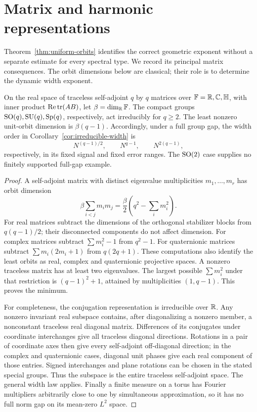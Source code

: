 \section{Matrix and harmonic representations}\label{sec:families}
Theorem~\ref{thm:uniform-orbits} identifies the correct geometric
exponent without a separate estimate for every spectral type. We
record its principal matrix consequences. The orbit dimensions below
are classical; their role is to determine the dynamic width exponent.

\begin{proposition}\label{prop:matrix-orbits}
On the real space of traceless self-adjoint $q$ by $q$ matrices over
$\mathbb F=\mathbb R,\mathbb C,\mathbb H$, with inner product $\operatorname{Re}\operatorname{tr}(AB)$, let
$\beta=\dim_\mathbb R\mathbb F$. The compact groups $\operatorname{SO}(q),\operatorname{SU}(q),\operatorname{Sp}(q)$,
respectively, act irreducibly for $q\ge2$. The least nonzero unit-orbit
dimension is $\beta(q-1)$. Accordingly, under a full group gap, the
width order in Corollary~\ref{cor:irreducible-width} is
\begin{equation}\label{eq:matrix-laws}
 N^{(q-1)/2},\qquad N^{q-1},\qquad N^{2(q-1)},
\end{equation}
respectively, in its fixed signal and fixed error ranges. The
$\operatorname{SO}(2)$ case supplies no finitely supported full-gap example.
\end{proposition}
\begin{proof}
A self-adjoint matrix with distinct eigenvalue multiplicities
$m_1,\ldots,m_r$ has orbit dimension
\[
 \beta\sum_{i<j}m_i m_j=\frac\beta2
                         \left(q^2-\sum_i m_i^2\right).
\]
For real matrices subtract the dimensions of the orthogonal
stabilizer blocks from $q(q-1)/2$; their disconnected components do
not affect dimension. For complex matrices subtract
$\sum m_i^2-1$ from $q^2-1$. For quaternionic matrices subtract
$\sum m_i(2m_i+1)$ from $q(2q+1)$. These computations also identify
the least orbits as real, complex and quaternionic projective spaces.
A nonzero traceless matrix has at least two eigenvalues. The largest
possible $\sum m_i^2$ under that restriction is $(q-1)^2+1$,
attained by multiplicities $(1,q-1)$. This proves the minimum.

For completeness, the conjugation representation is irreducible over
$\mathbb R$. Any nonzero invariant real subspace contains, after diagonalizing
a nonzero member, a nonconstant traceless real diagonal matrix.
Differences of its conjugates under coordinate interchanges give all
traceless diagonal directions. Rotations in a pair of coordinate
axes then give every self-adjoint off-diagonal direction; in the
complex and quaternionic cases, diagonal unit phases give each real
component of those entries. Signed interchanges and plane rotations
can be chosen in the stated special groups. Thus the subspace is the
entire traceless self-adjoint space. The general width law applies.
Finally a finite measure on a torus has Fourier multipliers arbitrarily
close to one by simultaneous approximation, so it has no full norm gap
on its mean-zero $L^2$ space.
\end{proof}

